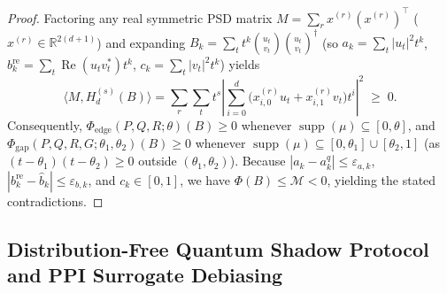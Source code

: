 \documentclass[11pt,a4paper]{article}
\theoremstyle{definition}
\DeclareMathOperator{\supp}{supp}
\newcommand{\R}{\mathbb{R}}
\begin{document}
\begin{proof}
Factoring any real symmetric PSD matrix $M = \sum_r x^{(r)} (x^{(r)})^\top$ ($x^{(r)} \in \R^{2(d+1)}$) and expanding $B_k = \sum_t t^k \binom{u_t}{v_t}\binom{u_t}{v_t}^\dagger$ (so $a_k = \sum_t |u_t|^2 t^k$, $b_k^{\mathrm{re}} = \sum_t \operatorname{Re}(u_t v_t^*) t^k$, $c_k = \sum_t |v_t|^2 t^k$) yields
\[
  \langle M, H_d^{(s)}(B)\rangle = \sum_r \sum_t t^s \left\lvert \sum_{i=0}^d \big(x^{(r)}_{i,0} u_t + x^{(r)}_{i,1} v_t\big) t^i \right\rvert^2 \;\ge\; 0.
\]
Consequently, $\Phi_{\mathrm{edge}}(P,Q,R;\theta)(B) \ge 0$ whenever $\supp(\mu) \subseteq [0,\theta]$, and $\Phi_{\mathrm{gap}}(P,Q,R,G;\theta_1,\theta_2)(B) \ge 0$ whenever $\supp(\mu) \subseteq [0,\theta_1]\cup[\theta_2,1]$ (as $(t - \theta_1)(t - \theta_2) \ge 0$ outside $(\theta_1,\theta_2)$). Because $|a_k - a_k^q| \le \varepsilon_{a,k}$, $|b_k^{\mathrm{re}} - \hat{b}_k| \le \varepsilon_{b,k}$, and $c_k \in [0,1]$, we have $\Phi(B) \le \mathcal{M} < 0$, yielding the stated contradictions.
\end{proof}

\subsection{Distribution-Free Quantum Shadow Protocol and PPI Surrogate Debiasing}
\end{document}

